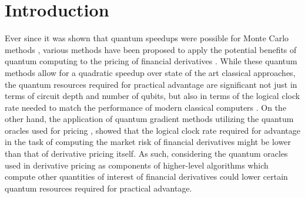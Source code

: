 \section{Introduction}
Ever since it was shown that quantum speedups were possible for Monte Carlo methods \cite{montanaro2015quantum}, various methods have been proposed to apply the potential benefits of quantum computing to the pricing of financial derivatives \cite{rebentrost2018quantum, Woerner_2019, Stamatopoulos_2020, Herbert_2022}.
While these quantum methods allow for a quadratic speedup over state of the art classical approaches, the quantum resources required for practical advantage are significant not just in terms of circuit depth and number of qubits, but also in terms of the logical clock rate needed to match the performance of modern classical computers \cite{chakrabarti2021threshold}.
On the other hand, the application of quantum gradient methods utilizing the quantum oracles used for pricing \cite{Stamatopoulos_2022}, showed that the logical clock rate required for advantage in the task of computing the market risk of financial derivatives might be lower than that of derivative pricing itself.
As such, considering the quantum oracles used in derivative pricing as components of higher-level algorithms which compute other quantities of interest of financial derivatives could lower certain quantum resources required for practical advantage.

